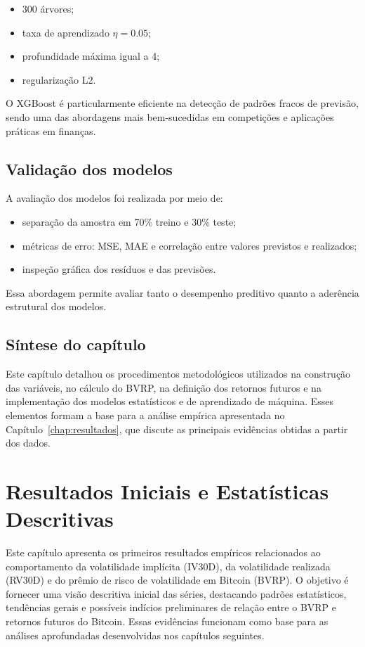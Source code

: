 \begin{itemize}
    \item 300 árvores;
    \item taxa de aprendizado $\eta = 0.05$;
    \item profundidade máxima igual a 4;
    \item regularização L2.
\end{itemize}

O XGBoost é particularmente eficiente na detecção de padrões fracos de
previsão, sendo uma das abordagens mais bem-sucedidas em competições e
aplicações práticas em finanças.

\section{Validação dos modelos}

A avaliação dos modelos foi realizada por meio de:

\begin{itemize}
    \item separação da amostra em 70\% treino e 30\% teste;
    \item métricas de erro: MSE, MAE e correlação entre valores previstos e realizados;
    \item inspeção gráfica dos resíduos e das previsões.
\end{itemize}

Essa abordagem permite avaliar tanto o desempenho preditivo quanto a aderência
estrutural dos modelos.

\section{Síntese do capítulo}

Este capítulo detalhou os procedimentos metodológicos utilizados na construção
das variáveis, no cálculo do BVRP, na definição dos retornos futuros e na
implementação dos modelos estatísticos e de aprendizado de máquina. Esses
elementos formam a base para a análise empírica apresentada no
Capítulo~\ref{chap:resultados}, que discute as principais evidências obtidas a
partir dos dados.

\chapter{Resultados Iniciais e Estatísticas Descritivas}
\label{chap:resultados_iniciais}

Este capítulo apresenta os primeiros resultados empíricos relacionados ao
comportamento da volatilidade implícita (IV30D), da volatilidade realizada
(RV30D) e do prêmio de risco de volatilidade em Bitcoin (BVRP).
O objetivo é fornecer uma visão descritiva inicial das séries, destacando
padrões estatísticos, tendências gerais e possíveis indícios preliminares de
relação entre o BVRP e retornos futuros do Bitcoin. Essas evidências funcionam
como base para as análises aprofundadas desenvolvidas nos capítulos seguintes.

